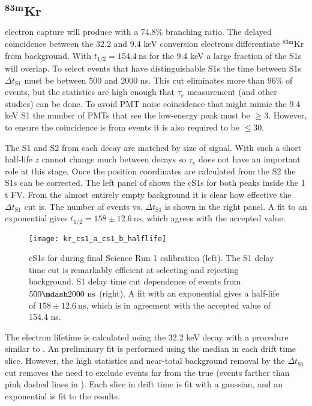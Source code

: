 \subsection{$\mathbf{^{83m}Kr}$}
\label{subsec:electron_lifetimes_measurement_kr}
 electron capture will produce \metakr with a 74.8\% branching ratio.  The delayed coincidence between the 32.2 and 9.4 keV
conversion electrons differentiate $\mathrm{^{83m}Kr}$ from background.  With
$t_{1/2} = 154.4\ \mathrm{ns}$ for the 9.4 keV a large fraction of the S1s will overlap.  To select events that have distinguishable S1s
the time between S1s $\Delta t_{\mathrm{S1}}$ must be between 500 and 2000 ns.  This cut eliminates more than 96\% of \metakr events, but
the statistics are high enough that $\tau_e$ measurement (and other studies) can be done.  To avoid PMT noise coincidence that might mimic
the 9.4 keV S1
the number of PMTs that see the low-energy peak must be $\geq 3$.  However, to ensure the coincidence is from \metakr events it is also
required to be $\leq 30$.

The S1 and S2 from each decay are matched by size of signal.  With such a short half-life $z$ cannot change much between decays so
$\tau_e$ does not have an important role at this stage.  Once the position coordinates are calculated from the S2 the S1s can be
corrected.  The left panel of  shows the cS1s for both peaks inside the
1 t FV.  From the
almost entirely empty background it is clear how effective the $\Delta t_{\mathrm{S1}}$ cut is.  The number of events vs.
$\Delta t_{\mathrm{S1}}$ is shown in the right panel.  A fit to an exponential gives $t_{1/2} = 158 \pm 12.6\ \mathrm{ns}$, which
agrees with the accepted value.

\begin{figure}
\centering
\texttt{[image: kr\_cs1\_a\_cs1\_b\_halflife]}
\caption{cS1s for \metakr during final Science Run 1 calibration (left).  The S1 delay time cut is remarkably efficient at selecting
\metakr and rejecting background.  S1 delay time cut dependence of events from $500 \mdash 2000\ \mathrm{ns}$ (right).  A fit with
an exponential gives a half-life of $158 \pm 12.6\ \mathrm{ns}$, which is in agreement with the accepted value of 154.4 ns.}
\label{fig:electron_lifetimes_measurement_kr_cs1_halflife}
\end{figure}

The electron lifetime is calculated using the 32.2 keV decay with a procedure similar to \alphadecays
{}.  An preliminary fit is performed using the median \stwob in each drift time
slice.  However, the high statistics and near-total background removal by the $\Delta t_{\mathrm{S1}}$ cut
removes the need to exclude events far from the true \metakr (events farther than pink dashed lines in
).  Each slice in drift time is fit with a gaussian, and an exponential
is fit to the results.

